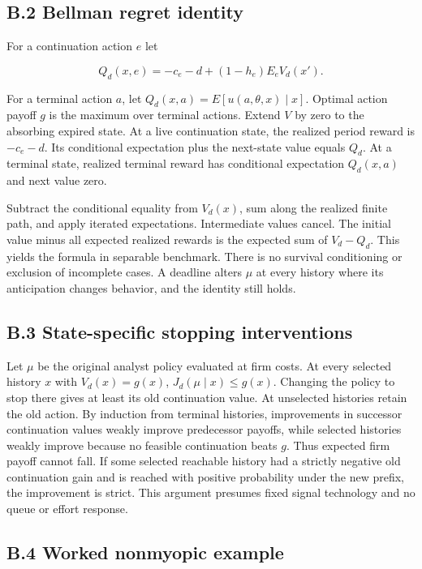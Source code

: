 \documentclass[
  11pt,
]{article}
\begin{document}
\subsection{B.2 Bellman regret
identity}\label{b.2-bellman-regret-identity}

For a continuation action \(e\) let

\[Q_d(x,e)=-c_e-d+(1-h_e)E_e V_d(x').\]

For a terminal action \(a\), let \(Q_d(x,a)=E[u(a,\theta,x)\mid x]\).
Optimal action payoff \(g\) is the maximum over terminal actions. Extend
\(V\) by zero to the absorbing expired state. At a live continuation
state, the realized period reward is \(-c_e-d\). Its conditional
expectation plus the next-state value equals \(Q_d\). At a terminal
state, realized terminal reward has conditional expectation \(Q_d(x,a)\)
and next value zero.

Subtract the conditional equality from \(V_d(x)\), sum along the
realized finite path, and apply iterated expectations. Intermediate
values cancel. The initial value minus all expected realized rewards is
the expected sum of \(V_d-Q_d\). This yields the formula in separable
benchmark. There is no survival conditioning or exclusion of incomplete
cases. A deadline alters \(\mu\) at every history where its anticipation
changes behavior, and the identity still holds.

\subsection{B.3 State-specific stopping
interventions}\label{b.3-state-specific-stopping-interventions}

Let \(\mu\) be the original analyst policy evaluated at firm costs. At
every selected history \(x\) with \(V_d(x)=g(x)\),
\(J_d(\mu\mid x)\leq g(x)\). Changing the policy to stop there gives at
least its old continuation value. At unselected histories retain the old
action. By induction from terminal histories, improvements in successor
continuation values weakly improve predecessor payoffs, while selected
histories weakly improve because no feasible continuation beats \(g\).
Thus expected firm payoff cannot fall. If some selected reachable
history had a strictly negative old continuation gain and is reached
with positive probability under the new prefix, the improvement is
strict. This argument presumes fixed signal technology and no queue or
effort response.

\subsection{B.4 Worked nonmyopic
example}\label{b.4-worked-nonmyopic-example}
\end{document}
